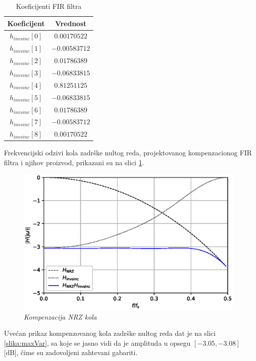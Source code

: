 \documentclass[conference]{IEEEtran}
\begin{document}
\begin{table}[h!]
	\centering
	\caption{Koeficijenti FIR filtra}
	\begin{tabular}{ c|c } 
		Koeficijent		&   Vrednost\\
		\hline
		$h_{invsinc}[0]$ &  $0.00170522$\\ 
		$h_{invsinc}[1]$ &  $-0.00583712$\\ 
		$h_{invsinc}[2]$ &  $0.01786389$\\ 
		$h_{invsinc}[3]$ &  $-0.06833815$\\ 
		$h_{invsinc}[4]$ &  $0.81251125$\\ 
		$h_{invsinc}[5]$ &  $-0.06833815$\\ 
		$h_{invsinc}[6]$ &  $0.01786389$\\
		$h_{invsinc}[7]$ &  $-0.00583712$\\  
		$h_{invsinc}[8]$ &  $0.00170522$\\ 
	\end{tabular}
	\label{table:FIR}
\end{table}


Frekvencijski odzivi kola zadrške nultog reda, projektovanog kompenzacionog FIR filtra i njihov proizvod, prikazani su na slici \ref{slika:nrz_komp}. 

\begin{figure}[h]
	\centering
	\includegraphics[scale=0.45]{./slike/nrz_komp.eps}
	\caption{\textsl{Kompenzacija NRZ kola}}
	\label{slika:nrz_komp}
\end{figure}

Uvećan prikaz kompenzovanog kola zadrške nultog reda dat je na slici \ref{slika:maxVar}, sa koje se jasno vidi da je amplituda u opsegu $[-3.05, -3.08]$\,[dB], čime su zadovoljeni zahtevani gabariti. \pagebreak
\end{document}
